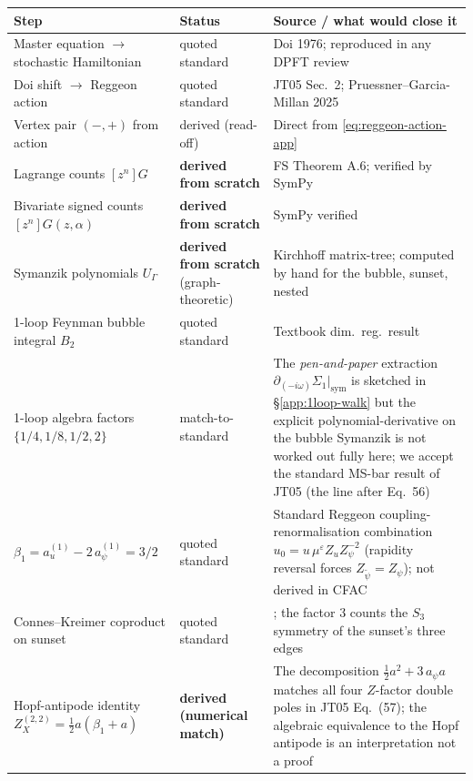 \documentclass[11pt,a4paper]{article}
\theoremstyle{definition}
\theoremstyle{plain}
\begin{document}
\begin{stdbox}
\begin{center}\small
\renewcommand{\arraystretch}{1.15}
\begin{tabular}{@{}p{4.7cm}p{3.3cm}p{6.4cm}@{}}
\toprule
\textbf{Step} & \textbf{Status} & \textbf{Source / what would close it} \\
\midrule
Master equation $\to$ stochastic Hamiltonian
  & quoted standard
  & Doi 1976; reproduced in any DPFT review \\
Doi shift $\to$ Reggeon action
  & quoted standard
  & JT05 Sec.~2; Pruessner--Garcia-Millan 2025 \\
Vertex pair $(-,+)$ from action
  & derived (read-off)
  & Direct from \cref{eq:reggeon-action-app} \\
Lagrange counts $[z^n] G$
  & \textbf{derived from scratch}
  & FS Theorem A.6; verified by SymPy \\
Bivariate signed counts $[z^n]G(z,\alpha)$
  & \textbf{derived from scratch}
  & SymPy verified \\
Symanzik polynomials $U_\Gamma$
  & \textbf{derived from scratch} (graph-theoretic)
  & Kirchhoff matrix-tree; computed by hand for the bubble, sunset, nested \\
1-loop Feynman bubble integral $B_2$
  & quoted standard
  & Textbook dim.\ reg.\ result \\
1-loop algebra factors $\{1/4, 1/8, 1/2, 2\}$
  & match-to-standard
  & The {\em pen-and-paper} extraction $\partial_{(-i\omega)} \Sigma_1|_{\text{sym}}$ is sketched in \S\ref{app:1loop-walk} but the explicit polynomial-derivative on the bubble Symanzik is not worked out fully here; we accept the standard MS-bar result of JT05 (the line after Eq.~56) \\
$\beta_1 = a_u^{(1)} - 2\,a_\psi^{(1)} = 3/2$
  & quoted standard
  & Standard Reggeon coupling-renormalisation combination $u_0 = u\,\mu^\varepsilon Z_u Z_\psi^{-2}$ (rapidity reversal forces $Z_{\tilde\psi} = Z_\psi$); not derived in CFAC \\
Connes--Kreimer coproduct on sunset
  & quoted standard
  & \cite{ConnesKreimer1998}; the factor $3$ counts the $S_3$ symmetry of the sunset's three edges \\
Hopf-antipode identity $Z_X^{(2,2)} = \tfrac12 a (\beta_1 + a)$
  & \textbf{derived (numerical match)}
  & The decomposition $\tfrac12 a^2 + 3\,a_\psi a$ matches all four $Z$-factor double poles in JT05 Eq.~(57); the algebraic equivalence to the Hopf antipode is an interpretation not a proof \\

\end{tabular}
\end{center}
\end{stdbox}
\end{document}
